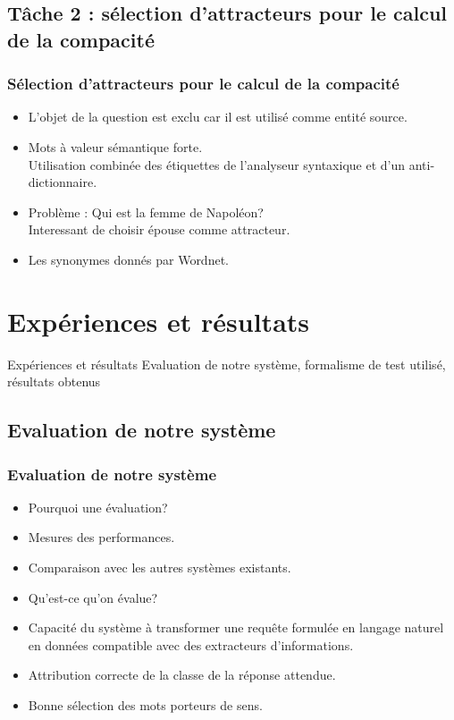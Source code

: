 \documentclass[xcolor=dvipsnames]{beamer}
\begin{document}
\subsection{Tâche 2 : sélection d'attracteurs pour le calcul de la compacité}
\frame
{
    \frametitle{Sélection d'attracteurs pour le calcul de la compacité}
    \begin{itemize}
        \item<1-> L'objet de la question est exclu car il est utilisé comme entité source.
        \item<2-> Mots à valeur sémantique forte. \\
            Utilisation combinée des étiquettes de l'analyseur syntaxique et d'un anti-dictionnaire.
        \item<3-> Problème : Qui est la femme de Napoléon?\\
            Interessant de choisir épouse comme attracteur.
        \item<4-> Les synonymes donnés par Wordnet.
    \end{itemize}
}

\section{Expériences et résultats}
\begin{frame}
\begin{block}{\Large{Expériences et résultats}}
\tiny{Evaluation de notre système, formalisme de test utilisé, résultats obtenus}
\end{block}
\end{frame}
\subsection{Evaluation de notre système}
\frame
{
  \frametitle{Evaluation de notre système}
  \begin{itemize}
    \item<1-> Pourquoi une évaluation?
    \item<2-> Mesures des performances.
    \item<3-> Comparaison avec les autres systèmes existants.
    \item<4-> Qu'est-ce qu'on évalue?
    \item<5-> Capacité du système à transformer une requête formulée en langage naturel en données compatible avec des extracteurs d'informations.
    \item<5-> Attribution correcte de la classe de la réponse attendue.
    \item<6-> Bonne sélection des mots porteurs de sens.
  \end{itemize}
}
\end{document}
